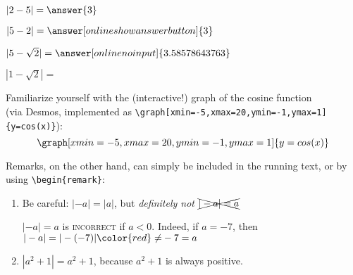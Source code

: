 \documentclass{ximera}
\begin{document}
\begin{exercise}\nl 

    \begin{xmmulticols}
    \begin{question} $|2-5|        = \answer{3}$                            \end{question}
    \begin{question} $|5-2|        = \answer[onlineshowanswerbutton]{3}$    \end{question}
    \begin{question} $|5-\sqrt{2}| = \answer[onlinenoinput]{3.58578643763}$ \end{question}
    \begin{question} 
        $|1-\sqrt{2}| = $
    \end{question}
    \end{xmmulticols}
\end{exercise}

Familiarize yourself with the (interactive!) graph of the cosine function  \\
(via Desmos, implemented as \verb|\graph[xmin=-5,xmax=20,ymin=-1,ymax=1]{y=cos(x)}|):
\[  
\graph[xmin=-5,xmax=20,ymin=-1,ymax=1]{y=cos(x)}  
\] 

Remarks, on the other hand, can simply be included in the running text, or by using \verb|\begin{remark}|:

\begin{remark} \nl
		\begin{enumerate}
			\item Be careful: $|-a|= |a|$, but \textit{definitely not} $\xcancel{|-a|=a}$

			$|-a|=a$ is \textsc{incorrect} if $a<0$. Indeed, if $a=-7$, then $|-a| = |-(-7)| {\color{red}\neq} -7 = a$
			\item $|a^2 + 1| = a^2 + 1$, because $a^2+1$ is always positive.
\end{enumerate}
\end{remark}
\end{document}
